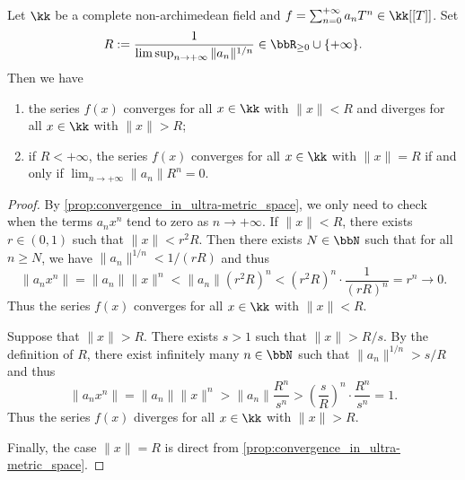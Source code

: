 


    \begin{proposition}\label{prop:convergent_radius_of_power_series}
        Let \(\kk\) be a complete non-archimedean field and \(f = \sum_{n=0}^{+\infty} a_n T^n \in \kk[[T]]\).
        Set 
        \[
            R := \frac{1}{\limsup_{n \to +\infty} \|a_n\|^{1/n}} \in \bbR_{\geq 0} \cup \{+\infty\}.
        \]
        Then we have 
        \begin{enumerate}
            \item the series \(f(x)\) converges for all \(x \in \kk\) with \(\|x\| < R\) and diverges for all \(x \in \kk\) with \(\|x\| > R\);
            \item if \(R < +\infty\), the series \(f(x)\) converges for all \(x \in \kk\) with \(\|x\| = R\) if and only if \(\lim_{n \to +\infty} \|a_n\| R^n = 0\).
        \end{enumerate}
    \end{proposition}
    \begin{proof}
        By \cref{prop:convergence_in_ultra-metric_space}, we only need to check when the terms \(a_n x^n\) tend to zero as \(n \to +\infty\).
        If \(\|x\| < R\), there exists \(r \in (0,1)\) such that \(\|x\| < r^2R\).
        Then there exists \(N \in \bbN\) such that for all \(n \geq N\), we have \(\|a_n\|^{1/n} < 1/(rR)\) and thus
        \[
            \|a_n x^n\| = \|a_n\| \|x\|^n < \|a_n\| (r^2R)^n < (r^2R)^n \cdot \frac{1}{(rR)^n} = r^n \to 0.
        \]
        Thus the series \(f(x)\) converges for all \(x \in \kk\) with \(\|x\| < R\).

        Suppose that \(\|x\| > R\).
        There exists \(s > 1\) such that \(\|x\| > R/s\).
        By the definition of \(R\), there exist infinitely many \(n \in \bbN\) such that \(\|a_n\|^{1/n} > s/R\) and thus
        \[
            \|a_n x^n\| = \|a_n\| \|x\|^n > \|a_n\| \frac{R^n}{s^n} > \left(\frac{s}{R}\right)^n \cdot \frac{R^n}{s^n} = 1.
        \]
        Thus the series \(f(x)\) diverges for all \(x \in \kk\) with \(\|x\| > R\).

        Finally, the case \(\|x\| = R\) is direct from \cref{prop:convergence_in_ultra-metric_space}.
    \end{proof}



